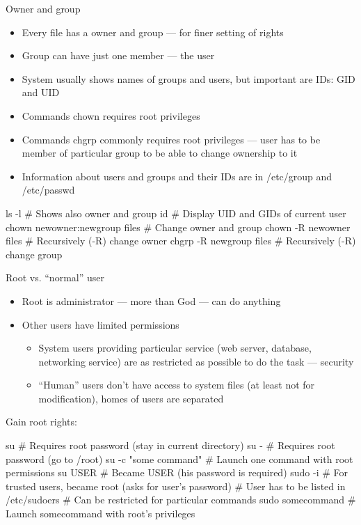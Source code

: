 \documentclass[compress, ucs, xelatex, 11pt, xcolor=svgnames,
  hyperref={
    bookmarks=true,
    unicode=true,
    colorlinks=true,
    pdftitle={Linux, command line and MetaCentrum},
    plainpages=false,
    pdfauthor={Vojtech Zeisek},
    pdfsubject={Course about use of Linux command line, writing shell scripts and using MetaCentrum of CESNET},
    pdfcreator={XeLaTeX, http://www.xelatex.org/},
    pdfkeywords={Linux, GNU, BASH, shell, command line, MetaCentrum},
    linkcolor=Sienna,
    anchorcolor=black,
    citecolor=green,
    filecolor=magenta,
    menucolor=Sienna,
    urlcolor=cyan,
    pdftex},
  url={hyphens, lowtilde} %
  ]{beamer}
\begin{document}
\begin{frame}[fragile]{Owner and group}
\begin{itemize}
  \item Every file has a owner and group --- for finer setting of rights
  \item Group can have just one member --- the user
  \item System usually shows names of groups and users, but important are IDs: GID and UID
  \item Commands chown requires root privileges
  \item Commands chgrp commonly requires root privileges --- user has to be member of particular group to be able to change ownership to it
  \item Information about users and groups and their IDs are in /etc/group and /etc/passwd
\end{itemize}
  \begin{bashcode}
    ls -l # Shows also owner and group
    id # Display UID and GIDs of current user
    chown newowner:newgroup files # Change owner and group
    chown -R newowner files # Recursively (-R) change owner
    chgrp -R newgroup files # Recursively (-R) change group
  \end{bashcode}
\end{frame}

\begin{frame}[fragile]{Root vs. ``normal'' user}
\begin{itemize}
  \item Root is administrator --- more than God --- can do anything
  \item Other users have limited permissions
  \begin{itemize}
    \item System users providing particular service (web server, database, networking service) are as restricted as possible to do the task --- security
    \item ``Human'' users don't have access to system files (at least not for modification), homes of users are separated
  \end{itemize}
\end{itemize}
Gain root rights:
  \begin{bashcode}
    su # Requires root password (stay in current directory)
    su - # Requires root password (go to /root)
    su -c "some command" # Launch one command with root permissions
    su USER # Became USER (his password is required)
    sudo -i # For trusted users, became root (asks for user's password)
            # User has to be listed in /etc/sudoers
            # Can be restricted for particular commands
    sudo somecommand # Launch somecommand with root's privileges
  \end{bashcode}
\end{frame}
\end{document}
